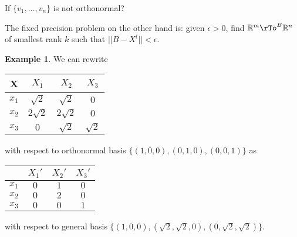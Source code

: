 \documentclass[12pt]{amsart}
\theoremstyle{definition}
\newtheorem{example}[theorem]{Example}
\begin{document}
If $\{v_1, \dots , v_n\}$ is not orthonormal?

The fixed precision problem on the other hand is: given $\epsilon > 0$, find $\mathbb{R}^m \rTo^B \mathbb{R}^n$ of smallest rank $k$ such that $||B - X^t|| < \epsilon$.

\begin{example} We can rewrite
\vspace{10pt}
\begin{center}
\begin{tabular}{c | c c c}
X & $X_1$ & $X_2$ & $X_3$ \\
\hline
$x_1$ & $\sqrt{2}$ & $ \sqrt{2} $ & $0$ \\
$x_2$ & $2\sqrt{2}$ & $2\sqrt{2}$ & $0$ \\
$x_3$ & $0$ & $\sqrt{2}$ & $\sqrt{2}$ \\
\end{tabular}
\end{center}
\vspace{10pt}

with respect to orthonormal basis $\{(1, 0, 0), (0, 1, 0), (0, 0, 1)\}$ as
\vspace{10pt}
\begin{center}
\begin{tabular}{c | c c c}
 & $X_1'$ & $X_2'$ & $X_3'$ \\
\hline
$x_1$ & $0$ & $1$ & $0$ \\
$x_2$ & $0$ & $2$ & $0$ \\
$x_3$ & $0$ & $0$ & $1$ \\
\end{tabular}
\end{center}
\vspace{10pt}
with respect to general basis $\{(1, 0, 0), (\sqrt{2}, \sqrt{2}, 0), (0, \sqrt{2}, \sqrt{2})\}$.
\end{example}

\newpage
\begin{bibdiv}
\begin{biblist}
\end{biblist}
\end{bibdiv}
\end{document}
